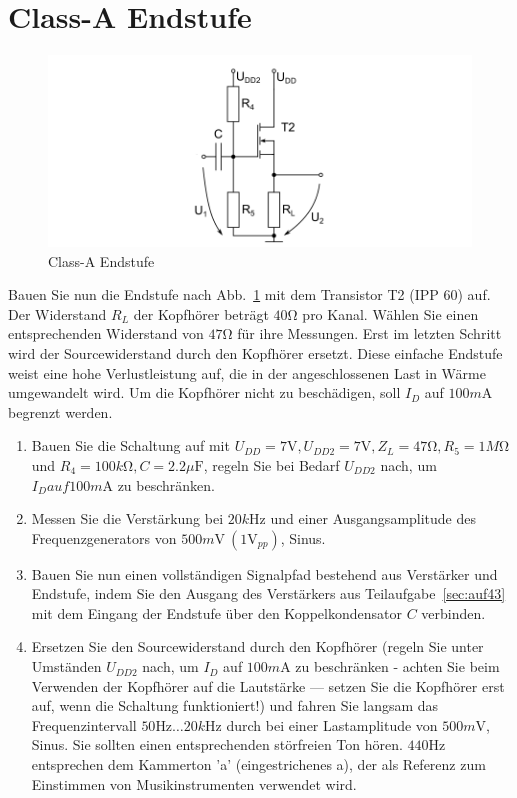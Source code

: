 \documentclass[10pt]{scrreprt}
\begin{document}
    \section{Class-A Endstufe}
    \begin{figure}[H]
        \includegraphics[width=\textwidth]{abb11.png}
        \caption{Class-A Endstufe}
        \label{fig:abb11}
    \end{figure}
    Bauen Sie nun die Endstufe nach Abb.~\ref{fig:abb11} mit dem Transistor T2 (IPP 60) auf. Der
    Widerstand $R_L$ der Kopfhörer beträgt $40\si{\ohm}$ pro Kanal. Wählen Sie einen entsprechenden
    Widerstand von $47\si{\ohm}$ für ihre Messungen. Erst im letzten Schritt wird der Sourcewiderstand
    durch den Kopfhörer ersetzt. Diese einfache Endstufe weist eine hohe Verlustleistung auf,
    die in der angeschlossenen Last in Wärme umgewandelt wird. Um die Kopfhörer nicht zu
    beschädigen, soll $I_D$ auf $100\si{m\ampere}$ begrenzt werden.
    \begin{enumerate}
        \item Bauen Sie die Schaltung auf mit $U_{DD} = 7\si{\volt}, U_{DD2} = 7\si{\volt}, Z_L = 47\si{\ohm}, R_5 = 1\si{M\ohm}$ und
            $R_4 = 100\si{k\ohm}, C = 2.2\si{\mu \farad}$, regeln Sie bei Bedarf $U_{DD2}$ nach, um $I_D auf 100\si{m\ampere}$ zu
            beschränken.
        \item Messen Sie die Verstärkung bei $20\si{k\hertz}$ und einer Ausgangsamplitude des
            Frequenzgenerators von $500\si{m\volt}\ (1\si{\volt}_{pp})$, Sinus.
        \item Bauen Sie nun einen vollständigen Signalpfad bestehend aus Verstärker und
            Endstufe, indem Sie den Ausgang des Verstärkers aus Teilaufgabe~\ref{sec:auf43} mit dem Eingang
            der Endstufe über den Koppelkondensator $C$ verbinden.
        \item Ersetzen Sie den Sourcewiderstand durch den Kopfhörer (regeln Sie unter
            Umständen $U_{DD2}$ nach, um $I_D$ auf $100\si{m\ampere}$ zu beschränken - achten Sie beim Verwenden der
            Kopfhörer auf die Lautstärke --- setzen Sie die Kopfhörer erst auf, wenn die
            Schaltung funktioniert!) und fahren Sie langsam das Frequenzintervall $50\si{\hertz} \ldots 20\si{k\hertz}$
            durch bei einer Lastamplitude von $500\si{m\volt}$, Sinus. Sie sollten einen entsprechenden
            störfreien Ton hören. $440\si{\hertz}$ entsprechen dem Kammerton ’a’ (eingestrichenes a),
            der als Referenz zum Einstimmen von Musikinstrumenten verwendet wird.
    \end{enumerate}
\end{document}
